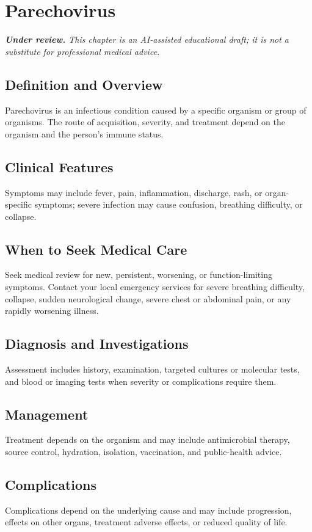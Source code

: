 \chapter{Parechovirus}

\medskip
\noindent\textit{\textbf{Under review.} This chapter is an AI-assisted educational draft; it is not a substitute for professional medical advice.}

\section*{Definition and Overview}
Parechovirus is an infectious condition caused by a specific organism or group of organisms. The route of acquisition, severity, and treatment depend on the organism and the person's immune status.

\section*{Clinical Features}
Symptoms may include fever, pain, inflammation, discharge, rash, or organ-specific symptoms; severe infection may cause confusion, breathing difficulty, or collapse.

\section*{When to Seek Medical Care}
Seek medical review for new, persistent, worsening, or function-limiting symptoms. Contact your local emergency services for severe breathing difficulty, collapse, sudden neurological change, severe chest or abdominal pain, or any rapidly worsening illness.

\section*{Diagnosis and Investigations}
Assessment includes history, examination, targeted cultures or molecular tests, and blood or imaging tests when severity or complications require them.

\section*{Management}
Treatment depends on the organism and may include antimicrobial therapy, source control, hydration, isolation, vaccination, and public-health advice.

\section*{Complications}
Complications depend on the underlying cause and may include progression, effects on other organs, treatment adverse effects, or reduced quality of life.

